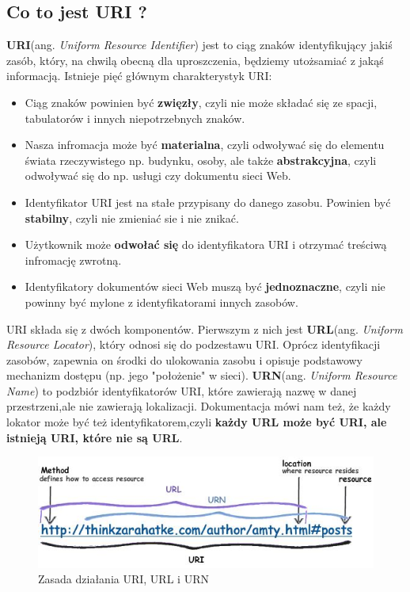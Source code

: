 \documentclass[oneside,polski,logo,indent]{amuthesis}
\begin{document}
\begin{center}
\subsection{Co to jest URI ?}
\end{center}
\textbf{URI}(ang. \emph{Uniform Resource Identifier}) jest to ciąg znaków identyfikujący jakiś zasób, który, na chwilą obecną dla uproszczenia, będziemy utożsamiać z jakąś informacją. Istnieje pięć głównym charakterystyk URI:
\begin{itemize}
\item Ciąg znaków powinien być \textbf{zwięzły}, czyli nie może składać się ze spacji, tabulatorów i innych niepotrzebnych znaków.\newline
\item Nasza infromacja może być \textbf{materialna}, czyli odwoływać się do elementu świata rzeczywistego np. budynku, osoby, ale także \textbf{abstrakcyjna}, czyli odwoływać się do np. usługi czy dokumentu sieci Web.\newline
\item Identyfikator URI jest na stałe przypisany do danego zasobu. Powinien być \textbf{stabilny}, czyli nie zmieniać sie i nie znikać.\newline
\item Użytkownik może \textbf{odwołać się} do identyfikatora URI i otrzymać treściwą infromację zwrotną.\newline
\item Identyfikatory dokumentów sieci Web muszą być \textbf{jednoznaczne}, czyli nie powinny być mylone z identyfikatorami innych zasobów.\newline
\end{itemize}
URI składa się z dwóch komponentów. Pierwszym z nich jest \textbf{URL}(ang. \emph{Uniform Resource Locator}), który odnosi się do podzestawu URI. Oprócz identyfikacji zasobów, zapewnia on środki do ulokowania zasobu i opisuje podstawowy mechanizm dostępu (np. jego "położenie" w sieci). \textbf{URN}(ang. \emph{Uniform Resource Name}) to podzbiór identyfikatorów URI, które zawierają nazwę w danej przestrzeni,\break ale nie zawierają lokalizacji. Dokumentacja mówi nam też, że każdy lokator może być też identyfikatorem,\break czyli \textbf{każdy URL może być URI, ale istnieją URI, które nie są URL}.

\begin{figure}[H]
\centering
\includegraphics[width=14cm]{uri.jpg}
\caption{Zasada działania URI, URL i URN}
\label{Cache}
\end{figure}
\end{document}
